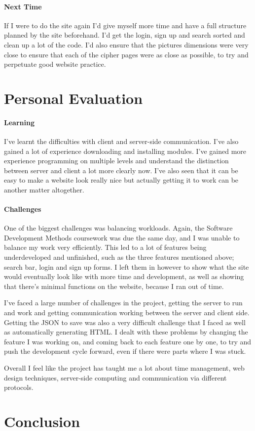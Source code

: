 \documentclass[10pt, a4paper]{article}
\begin{document}
	\paragraph{Next Time}
If I were to do the site again I'd give myself more time and have a full structure planned by the site beforehand. I'd get the login, sign up and search sorted and clean up a lot of the code.
I'd also ensure that the pictures dimensions were very close to ensure that each of the cipher pages were as close as possible, to try and perpetuate good website practice.

	\section{Personal Evaluation}
	\paragraph{Learning}
I've learnt the difficulties with client and server-side communication. I've also gained a lot of experience downloading and installing modules. I've gained more experience programming on multiple levels and understand the distinction between server and client a lot more clearly now. I've also seen that it can be easy to make a website look really nice but actually getting it to work can be another matter altogether.

	\paragraph{Challenges}
One of the biggest challenges was balancing workloads. Again, the Software Development Methods coursework was due the same day, and I was unable to balance my work very efficiently. This led to a lot of features being underdeveloped and unfinished, such as the three features mentioned above; search bar, login and sign up forms. I left them in however to show what the site would eventually look like with more time and development, as well as showing that there's minimal functions on the website, because I ran out of time.

I've faced a large number of challenges in the project, getting the server to run and work and getting communication working between the server and client side. Getting the JSON to save was also a very difficult challenge that I faced as well as automatically generating HTML. I dealt with these problems by changing the feature I was working on, and coming back to each feature one by one, to try and push the development cycle forward, even if there were parts where I was stuck.

Overall I feel like the project has taught me a lot about time management, web design techniques, server-side computing and communication via different protocols.
	
	\section{Conclusion}
	
	
\end{document}

